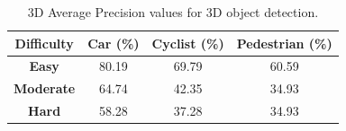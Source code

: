 \documentclass[10pt,twocolumn,letterpaper]{article}
\begin{document}
\begin{table}[!htbp]
    \centering
    \begin{tabular}{|c|c|c|c|}
        \hline \textbf{Difficulty} & \textbf{Car (\%)} & \textbf{Cyclist (\%)} & \textbf{Pedestrian (\%)}  \\
        \hline \textbf{Easy} & 80.19  & 69.79  & 60.59 \\
        \hline \textbf{Moderate} & 64.74  & 42.35 & 34.93 \\
        \hline \textbf{Hard} & 58.28  & 37.28  & 34.93  \\
        \hline
    \end{tabular}
	\caption[3D AP calculated for 2D proposals generated from 3D Annotations]{3D Average Precision values for 3D object detection.}
	\label{3DAP_Values-1}
    \end{table}
\end{document}
